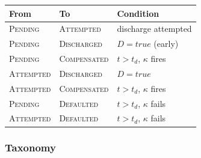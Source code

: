 \documentclass[11pt,a4paper]{article}
\begin{document}
\begin{center}
\small
\begin{tabular}{l l l}
\toprule
\textbf{From} & \textbf{To} & \textbf{Condition} \\
\midrule
\textsc{Pending}   & \textsc{Attempted}   & discharge attempted \\
\textsc{Pending}   & \textsc{Discharged}  & $D = \mathit{true}$ (early) \\
\textsc{Pending}   & \textsc{Compensated} & $t > t_d$, $\kappa$ fires \\
\textsc{Attempted} & \textsc{Discharged}  & $D = \mathit{true}$ \\
\textsc{Attempted} & \textsc{Compensated} & $t > t_d$, $\kappa$ fires \\
\textsc{Pending}   & \textsc{Defaulted}   & $t > t_d$, $\kappa$ fails \\
\textsc{Attempted} & \textsc{Defaulted}   & $t > t_d$, $\kappa$ fails \\
\bottomrule
\end{tabular}
\end{center}

\subsubsection{Taxonomy}
\label{sec:obligation-taxonomy}
\end{document}
